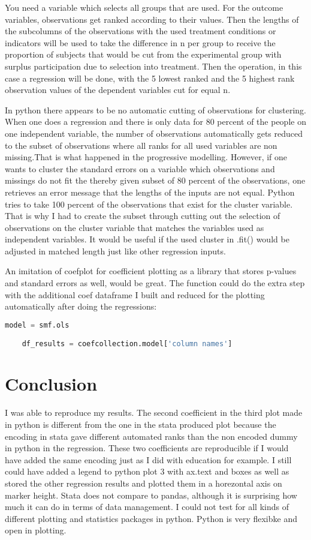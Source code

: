 \documentclass[10pt]{article}
\begin{document}
You need a variable which selects all groups that are used. For the outcome variables, observations get ranked
according to their values. Then the lengths of the subcolumns of the observations with the used treatment conditions 
or indicators will be used to take the difference in n per group to receive the proportion of subjects that would 
be cut from the experimental group with surplus participation due to selection into treatment.
Then the operation, in this case a regression will be done, with the 5 lowest ranked and the 5 highest rank observation
values of the dependent variables cut for equal n.

In python there appears to be no automatic cutting of observations for clustering. 
When one does a regression and there is only data for 80 percent of the people on one independent variable, 
the number of observations automatically gets reduced to the subset of observations where all ranks for all 
used variables are non missing.That is what happened in the progressive modelling. 
However, if one wants to cluster the standard errors on a variable which observations and missings do not fit
the thereby given subset of 80 percent of the observations, one retrieves an error message that the lengths 
of the inputs are not equal. Python tries to take 100 percent of the observations that exist for the cluster 
variable. That is why I had to create the subset through cutting out the selection of observations on the cluster
variable that matches the variables used as independent variables. 
It would be useful if the used cluster in .fit() would be adjusted in matched length just like other regression inputs.

An imitation of coefplot for coefficient plotting as a library that stores p-values and standard errors as 
well, would be great. The function could do the extra step with the additional coef dataframe I built and reduced 
for the plotting automatically after doing the regressions:

\begin{lstlisting}[language=Python]
    model = smf.ols

    df_results = coefcollection.model['column names']
\end{lstlisting}

\section{Conclusion}
I was able to reproduce my results. The second coefficient in the third plot made in python is different from the one in
the stata produced plot because the encoding in stata gave different automated ranks than the non encoded dummy in python 
in the regression. These two coefficients are reproducible if I would have added the same encoding just as I did with education for example.
I still could have added a legend to python plot 3 with ax.text and boxes as well as stored the other regression results
and plotted them in a horezontal axis on marker height. 
Stata does not compare to pandas, although it is surprising how much it can do in terms of data management.
I could not test for all kinds of different plotting and statistics packages in python.
Python is very flexibke and open in plotting.
\end{document}
